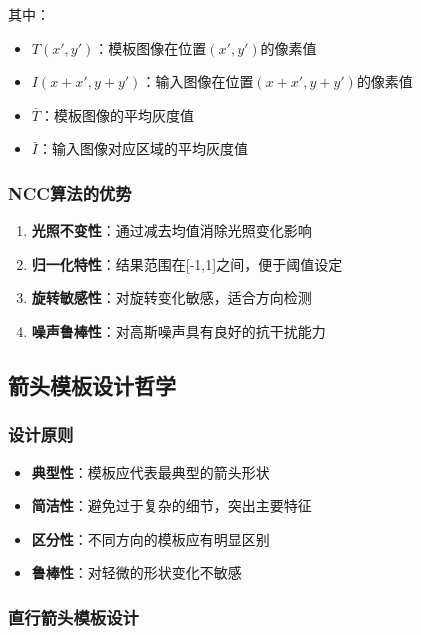 \documentclass[12pt]{article}
\begin{document}
其中：
\begin{itemize}
    \item $T(x',y')$：模板图像在位置$(x',y')$的像素值
    \item $I(x+x',y+y')$：输入图像在位置$(x+x',y+y')$的像素值
    \item $\bar{T}$：模板图像的平均灰度值
    \item $\bar{I}$：输入图像对应区域的平均灰度值
\end{itemize}

\subsubsection{NCC算法的优势}

\begin{enumerate}
    \item \textbf{光照不变性}：通过减去均值消除光照变化影响
    \item \textbf{归一化特性}：结果范围在[-1,1]之间，便于阈值设定
    \item \textbf{旋转敏感性}：对旋转变化敏感，适合方向检测
    \item \textbf{噪声鲁棒性}：对高斯噪声具有良好的抗干扰能力
\end{enumerate}

\subsection{箭头模板设计哲学}

\subsubsection{设计原则}

\begin{itemize}
    \item \textbf{典型性}：模板应代表最典型的箭头形状
    \item \textbf{简洁性}：避免过于复杂的细节，突出主要特征
    \item \textbf{区分性}：不同方向的模板应有明显区别
    \item \textbf{鲁棒性}：对轻微的形状变化不敏感
\end{itemize}

\subsubsection{直行箭头模板设计}
\end{document}
